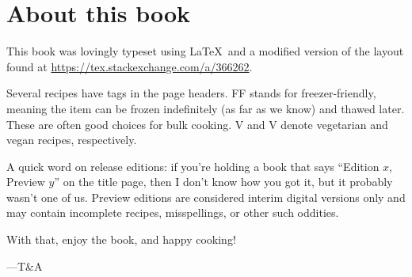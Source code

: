 \chapter{About this book}
This book was lovingly typeset using \LaTeX~and
a modified version of the layout found at
\url{https://tex.stackexchange.com/a/366262}.

\smallskip
Several recipes have tags in the page headers.
{\color{frzcolor}FF} stands for freezer-friendly,
meaning the item can be frozen indefinitely
(as far as we know) and thawed later.
These are often good choices for bulk cooking.
{\color{vegcolor}V} and {\color{vgncolor}V} denote
vegetarian and vegan recipes, respectively.

\smallskip
A quick word on release editions:
if you're holding a book that says
``Edition $x$, Preview $y$'' on the title page,
then I don't know how you got it,
but it probably wasn't one of us.
Preview editions are considered
interim digital versions only
and may contain incomplete recipes, misspellings,
or other such oddities.

\smallskip
With that, enjoy the book, and happy cooking!

\bigskip ---T\&A
